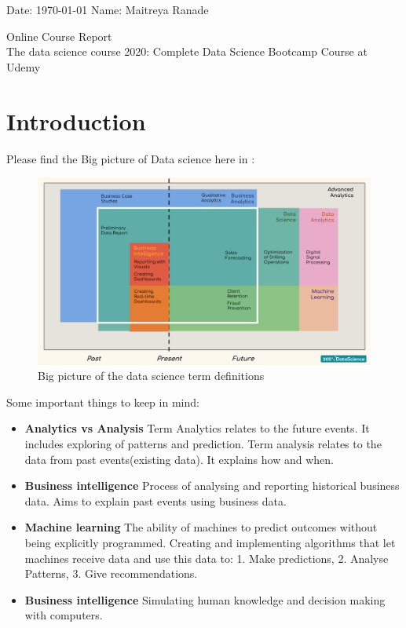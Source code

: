 \documentclass[12pt, a4paper]{article}
\begin{document}
\onehalfspacing
Date: \today{}     \hfill{}Name: Maitreya Ranade
\begin{center}
\vspace*{\fill}
{\LARGE Online Course Report} \\
The data science course 2020: Complete Data Science Bootcamp Course at Udemy \\
\vspace*{\fill}
\end{center}

\pagebreak
\singlespacing
\tableofcontents
\pagebreak


\section{Introduction}
Please find the Big picture of Data science here in :

\begin{figure}[H]
    \begin{center}
        \includegraphics[width=\textwidth,height=\textheight,keepaspectratio=true]{images/BigPicture.png}
        \caption{Big picture of the data science term definitions}
        \label{BigPicture}
    \end{center}
\end{figure}

Some important things to keep in mind:
\begin{itemize}
    \item{\textbf {Analytics vs Analysis}} Term Analytics relates to the future events. It includes exploring of patterns and prediction. Term analysis relates to the data from past events(existing data). It explains how and when.
    \item{\textbf {Business intelligence}} Process of analysing and reporting historical business data. Aims to explain past events using business data.
    \item{\textbf {Machine learning}} The ability of machines to predict outcomes without being explicitly programmed. Creating and implementing algorithms that let machines receive data and use this data to: 1. Make predictions, 2. Analyse Patterns, 3. Give recommendations.
    \item{\textbf {Business intelligence}} Simulating human knowledge and decision making with computers.
\end{itemize}
\end{document}
